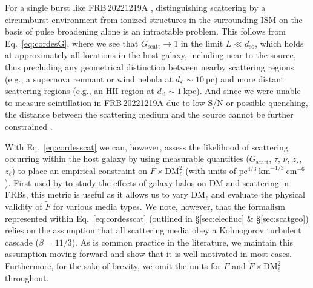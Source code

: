 \documentclass[twocolumn, linenumbers, tra]{aastex631}
\newcommand{\rev}[1]{{\color{purple}#1}}
\newcommand{\nihari}{FRB\,20221219A } %
\begin{document}
\rev{For a single burst like \nihari, distinguishing scattering by a circumburst environment from ionized structures in the surrounding ISM on the basis of pulse broadening alone is an intractable problem. This follows from Eq.~\ref{eq:cordesG}, where we see that $G_{\mathrm{scatt}} \rightarrow 1$ in the limit $L \ll d_{\mathrm{so}}$, which holds at approximately all locations in the host galaxy, including near to the source, thus precluding any geometrical distinction between nearby scattering regions (e.g., a supernova remnant or wind nebula at $d_{\mathrm{sl}} \sim 10\ \mathrm{pc}$) and more distant scattering regions (e.g., an HII region at $d_{\mathrm{sl}} \sim 1\ \mathrm{kpc}$). And since we were unable to measure scintillation in \nihari due to low S/N or possible quenching, the distance between the scattering medium and the source cannot be further constrained \citep[e.g., with a two-screen scattering model;][]{Masui2015, Ocker2022a, Sammons2023}. 

With Eq.~\ref{eq:cordesscat} we can, however, assess the likelihood of scattering occurring within the host galaxy by using measurable quantities ($G_{\mathrm{scatt}}$, $\tau$, $\nu$, $z_{\mathrm{s}}$, $z_{\ell}$) to place an empirical constraint on $\widetilde{F} \times \mathrm{DM}_{\ell}^{2}$ (with units of $\mathrm{pc}^{4/3}\mathrm{\ km}^{-1/3} \mathrm{\ cm}^{-6}$). First used by \citet{Ocker2021} to study the effects of galaxy halos on DM and scattering in FRBs, this metric is useful as it allows us to vary $\mathrm{DM}_{\ell}$ and evaluate the physical validity of $\widetilde{F}$ for various media types. We note, however, that the formalism represented within Eq.~\ref{eq:cordesscat} (outlined in \S\ref{sec:elecfluc} \& \S\ref{sec:scatgeo}) relies on the assumption that all scattering media obey a Kolmogorov turbulent cascade ($\beta = 11/3$). As is common practice in the literature, we maintain this assumption moving forward and show that it is well-motivated in most cases. Furthermore, for the sake of brevity, we omit the units for $\widetilde{F}$ and $\widetilde{F} \times \mathrm{DM}_{\ell}^{2}$ throughout. 

}
\end{document}
